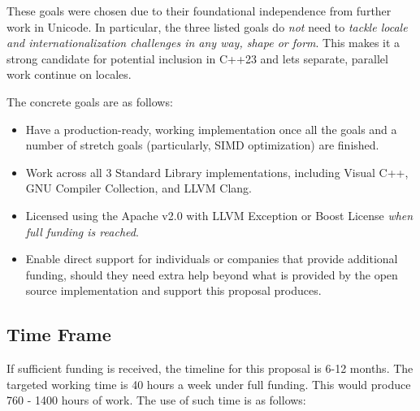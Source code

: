 \documentclass{wg21}
\begin{document}
These goals were chosen due to their foundational independence from further work in Unicode. In particular, the three listed goals do \emph{not} need to \emph{tackle locale and internationalization challenges in any way, shape or form}. This makes it a strong candidate for potential inclusion in C++23 and lets separate, parallel work continue on locales.

The concrete goals are as follows:

\begin{itemize}
	\item Have a production-ready, working implementation once all the goals and a number of stretch goals (particularly, SIMD optimization) are finished.
	\item Work across all 3 Standard Library implementations, including Visual C++, GNU Compiler Collection, and LLVM Clang.
	\item Licensed using the Apache v2.0 with LLVM Exception or Boost License \emph{when full funding is reached}.
	\item Enable direct support for individuals or companies that provide additional funding, should they need extra help beyond what is provided by the open source implementation and support this proposal produces.
\end{itemize}

\subsection[Time Frame]{Time Frame}

If sufficient funding is received, the timeline for this proposal is 6-12 months. The targeted working time is 40 hours a week under full funding. This would produce 760 - 1400 hours of work. The use of such time is as follows:
\end{document}
